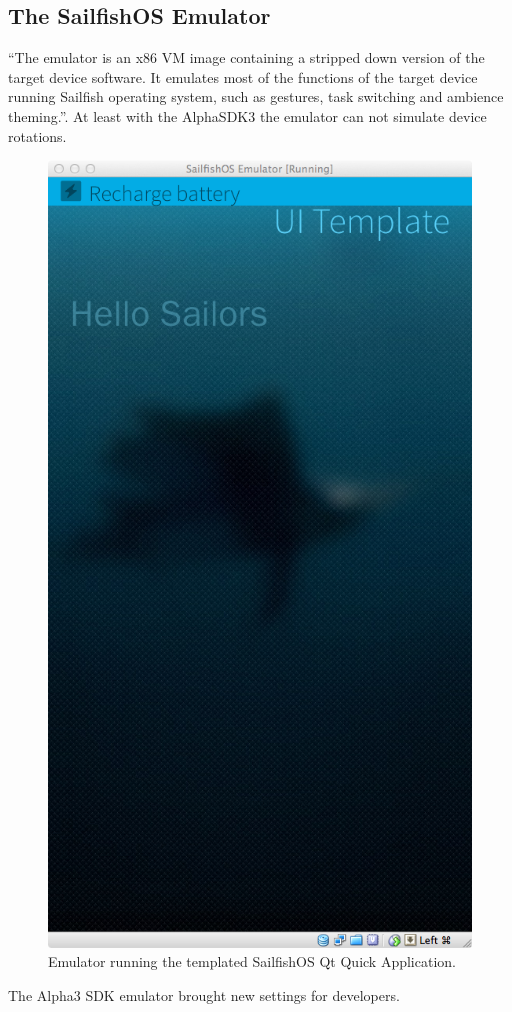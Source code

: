 \subsection{The SailfishOS Emulator}\label{subsec:SailfishEmulator}
%
``The emulator is an x86 VM image containing a stripped down version of the target device software. It emulates most of the functions of the target device running Sailfish operating system, such as gestures, task switching and ambience theming.''\cite{sailfishos3}.
At least with the AlphaSDK3 the emulator can not simulate device rotations.
%
\begin{figure}[H]
  \centering
  \includegraphics[scale=0.3]{../media/gfx/emulator/emulatorexample.png} 
  \caption{Emulator running the templated SailfishOS Qt Quick Application.}
  \label{fig:emulatorexample}
\end{figure}
%
The Alpha3 SDK emulator brought new settings for developers.


